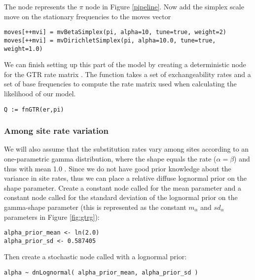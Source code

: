The node  represents the $\pi$ node in Figure \ref{pipeline}.
Now add the simplex scale move on the stationary frequencies to the moves vector

{\tt \small \begin{snugshade*}
\begin{lstlisting}
moves[++mvi] = mvBetaSimplex(pi, alpha=10, tune=true, weight=2) 
moves[++mvi] = mvDirichletSimplex(pi, alpha=10.0, tune=true, weight=1.0)
\end{lstlisting}
\end{snugshade*}}

We can finish setting up this part of the model by creating a deterministic node for the GTR rate matrix . 
The  function takes a set of exchangeability rates and a set of base frequencies to compute the rate matrix used when calculating the likelihood of our model.
{\tt \begin{snugshade*}
\begin{lstlisting}
Q := fnGTR(er,pi)
\end{lstlisting}
\end{snugshade*}}


\subsubsection{Among site rate variation}

We will also assume that the substitution rates vary among sites according to an one-parametric gamma distribution, \IE where the shape equals the rate ($\alpha=\beta$) and thus with mean 1.0 \citep{Yang1994a}. 
Since we do not have good prior knowledge about the variance in site rates, thus we can place a relative diffuse lognormal prior on the shape parameter.
Create a constant node called  for the mean parameter and a constant node called  for the standard deviation of the lognormal prior on the gamma-shape parameter (this is represented as the constant $m_\alpha$ and $sd_\alpha$ parameters in Figure \ref{fig:gtrg}):
{\tt\begin{snugshade*}
\begin{lstlisting}
alpha_prior_mean <- ln(2.0)
alpha_prior_sd <- 0.587405
\end{lstlisting}
\end{snugshade*}}

Then create a stochastic node called  with a lognormal prior:
{\tt\begin{snugshade*}
\begin{lstlisting}
alpha ~ dnLognormal( alpha_prior_mean, alpha_prior_sd )
\end{lstlisting}
\end{snugshade*}}

